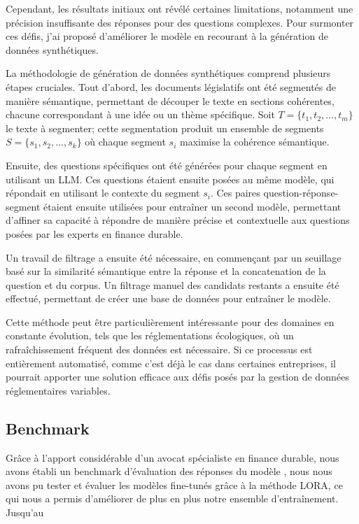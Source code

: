 \documentclass[13pt,a4paper]{article}
\begin{document}
Cependant, les résultats initiaux ont révélé certaines limitations, notamment une précision insuffisante des réponses pour des questions complexes. Pour surmonter ces défis, j'ai proposé d'améliorer le modèle en recourant à la génération de données synthétiques.

La méthodologie de génération de données synthétiques comprend plusieurs étapes cruciales. Tout d'abord, les documents législatifs ont été segmentés de manière sémantique, permettant de découper le texte en sections cohérentes, chacune correspondant à une idée ou un thème spécifique. Soit $T = \{t_1, t_2, \dots, t_m\}$ le texte à segmenter; cette segmentation produit un ensemble de segments $S = \{s_1, s_2, \dots, s_k\}$ où chaque segment $s_i$ maximise la cohérence sémantique.

Ensuite, des questions spécifiques ont été générées pour chaque segment en utilisant un LLM. Ces questions étaient ensuite posées au même modèle, qui répondait en utilisant le contexte du segment $s_i$. Ces paires question-réponse-segment étaient ensuite utilisées pour entraîner un second modèle, permettant d'affiner sa capacité à répondre de manière précise et contextuelle aux questions posées par les experts en finance durable.

Un travail de filtrage a ensuite été nécessaire, en commençant par un seuillage basé sur la similarité sémantique entre la réponse et la concatenation de la question et du corpus. Un filtrage manuel des candidats restants a ensuite été effectué, permettant de créer une base de données pour entraîner le modèle. 

Cette méthode peut être particulièrement intéressante pour des domaines en constante évolution, tels que les réglementations écologiques, où un rafraîchissement fréquent des données est nécessaire. Si ce processus est entièrement automatisé, comme c'est déjà le cas dans certaines entreprises, il pourrait apporter une solution efficace aux défis posés par la gestion de données réglementaires variables.


\subsection{Benchmark}
Grâce à l'apport considérable d'un avocat spécialiste en finance durable, nous avons établi un benchmark d'évaluation des réponses du modèle , nous  nous avons pu tester et évaluer les modèles fine-tunés grâce à la méthode LORA, ce qui nous a permis d'améliorer de plus en plus notre ensemble d'entraînement. Jusqu'au 
\end{document}
